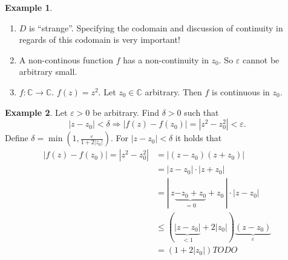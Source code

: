 \documentclass[a4paper,landscape,twocolumn]{article}
\theoremstyle{definition}
\newtheorem{ex}{Example}
\newcommand\abs[1]{\left|#1\right|}
\begin{document}
\begin{ex}
  \begin{enumerate}
    \item $D$ is \enquote{strange}.
      Specifying the codomain and discussion of continuity in regards of this codomain is very important!
    \item A non-continous function
      $f$ has a non-continuity in $z_0$.
      So $\varepsilon$ cannot be arbitrary small.
    \item
      $f: \mathbb C \rightarrow \mathbb C$. $f(z) = z^2$.
      Let $z_0 \in \mathbb C$ arbitrary. Then $f$ is continuous in $z_0$.
  \end{enumerate}
\end{ex}
%
\begin{ex}
  Let $\varepsilon > 0$ be arbitrary. Find $\delta > 0$ such that
  \[ \abs{z - z_0} < \delta \Rightarrow \abs{f(z) - f(z_0)} = \abs{z^2 - z_0^2} < \varepsilon. \]
  Define $\delta = \min\left(1, \frac{\varepsilon}{1 + 2\abs{z_0}}\right)$.
  For $\abs{z - z_0} < \delta$ it holds that
  \begin{align*}
    \abs{f(z) - f(z_0)} = \abs{z^2 - z_0^2}
    &= \abs{(z - z_0) (z + z_0)} \\
    &= \abs{z - z_0} \cdot \abs{z + z_0} \\
    &= |\, z \underbrace{- z_0 + z_0}_{=0} + z_0\,| \cdot \abs{z - z_0} \\
    &\leq (\underbrace{\abs{z - z_0}}_{<1} + 2 \abs{z_0}) \underbrace{(z - z_0)}_{\varepsilon} \\
    &= \left(1 + 2 \abs{z_0}\right) TODO
  \end{align*}
\end{ex}
%
\end{document}
